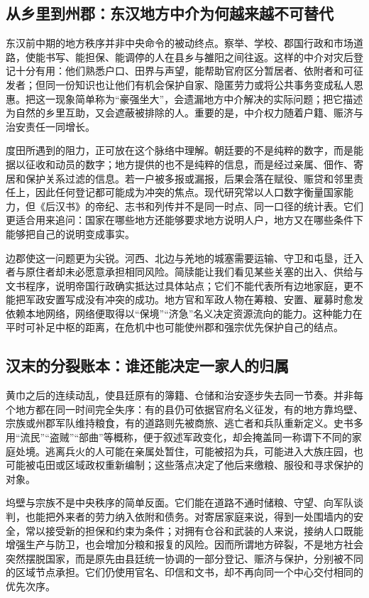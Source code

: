 \subsection{从乡里到州郡：东汉地方中介为何越来越不可替代}

东汉前中期的地方秩序并非中央命令的被动终点。察举、学校、郡国行政和市场道路，使能书写、能担保、能调停的人在县乡与雒阳之间往返。这样的中介对灾后登记十分有用：他们熟悉户口、田界与声望，能帮助官府区分暂居者、依附者和可征发者；但同一份知识也让他们有机会保护自家、隐匿劳力或将公共事务变成私人恩惠。把这一现象简单称为“豪强坐大”，会遗漏地方中介解决的实际问题；把它描述为自然的乡里互助，又会遮蔽被排除的人。重要的是，中介权力随着户籍、赈济与治安责任一同增长。

度田所遇到的阻力，正可放在这个脉络中理解。朝廷要的不是纯粹的数字，而是能据以征收和动员的数字；地方提供的也不是纯粹的信息，而是经过亲属、佃作、寄居和保护关系过滤的信息。若一户被多报或漏报，后果会落在赋役、赈贷和邻里责任上，因此任何登记都可能成为冲突的焦点。现代研究常以人口数字衡量国家能力，但《后汉书》的帝纪、志书和列传并不是同一时点、同一口径的统计表。它们更适合用来追问：国家在哪些地方还能够要求地方说明人户，地方又在哪些条件下能够把自己的说明变成事实。

边郡使这一问题更为尖锐。河西、北边与羌地的城塞需要运输、守卫和屯垦，迁入者与原住者却未必愿意承担相同风险。简牍能让我们看见某些关塞的出入、供给与文书程序，说明帝国行政确实抵达过具体站点；它们不能代表所有边地家庭，更不能把军政安置写成没有冲突的成功。地方官和军政人物在筹粮、安置、雇募时愈发依赖本地网络，网络便取得以“保境”“济急”名义决定资源流向的能力。这种能力在平时可补足中枢的距离，在危机中也可能使州郡和强宗优先保护自己的结点。

\subsection{汉末的分裂账本：谁还能决定一家人的归属}

黄巾之后的连续动乱，使县廷原有的簿籍、仓储和治安逐步失去同一节奏。并非每个地方都在同一时间完全失序：有的县仍可依据官府名义征发，有的地方靠坞壁、宗族或州郡军队维持粮食，有的道路则先被商旅、逃亡者和兵队重新定义。史书多用“流民”“盗贼”“部曲”等概称，便于叙述军政变化，却会掩盖同一称谓下不同的家庭处境。逃离兵火的人可能在亲属处暂住，可能被招为兵，可能进入大族庄园，也可能被屯田或区域政权重新编制；这些落点决定了他后来缴粮、服役和寻求保护的对象。

坞壁与宗族不是中央秩序的简单反面。它们能在道路不通时储粮、守望、向军队谈判，也能把外来者的劳力纳入依附和债务。对寄居家庭来说，得到一处围墙内的安全，常以接受新的担保和约束为条件；对拥有仓谷和武装的人来说，接纳人口既能增强生产与防卫，也会增加分粮和报复的风险。因而所谓地方碎裂，不是地方社会突然摆脱国家，而是原先由县廷统一协调的一部分登记、赈济与保护，分别被不同的区域节点承担。它们仍使用官名、印信和文书，却不再向同一个中心交付相同的优先次序。

